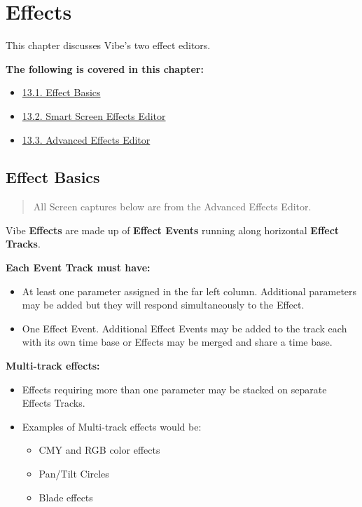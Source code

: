 \documentclass[
]{article}
\providecommand{\tightlist}{%
  \setlength{\itemsep}{0pt}\setlength{\parskip}{0pt}}
\begin{document}
\hypertarget{effects-1}{%
\section{Effects}\label{effects-1}}

This chapter discusses Vibe's two effect editors.

\textbf{The following is covered in this chapter:}

\begin{itemize}
\tightlist
\item
  \href{https://vibemanual.compulite.com/effects-1.html\#effect-basics}{13.1. Effect Basics}
\item
  \href{https://vibemanual.compulite.com/effects-1.html\#smart-screen-effects-editor}{13.2. Smart Screen Effects Editor}
\item
  \href{https://vibemanual.compulite.com/effects-1.html\#advanced-effects-editor}{13.3. Advanced Effects Editor}
\end{itemize}

\hypertarget{effect-basics}{%
\subsection{Effect Basics}\label{effect-basics}}

\begin{quote}
All Screen captures below are from the Advanced Effects Editor.
\end{quote}

Vibe \textbf{Effects} are made up of \textbf{Effect Events} running along horizontal \textbf{Effect Tracks}.

\textbf{Each Event Track must have:}

\begin{itemize}
\item
  At least one parameter assigned in the far left column. Additional parameters may be added but they will respond simultaneously to the Effect.
\item
  One Effect Event. Additional Effect Events may be added to the track each with its own time base or Effects may be merged and share a time base.
\end{itemize}

\textbf{Multi-track effects:}

\begin{itemize}
\item
  Effects requiring more than one parameter may be stacked on separate Effects Tracks.
\item
  Examples of Multi-track effects would be:

  \begin{itemize}
  \item
    CMY and RGB color effects
  \item
    Pan/Tilt Circles
  \item
    Blade effects
  \end{itemize}
\end{itemize}
\end{document}
